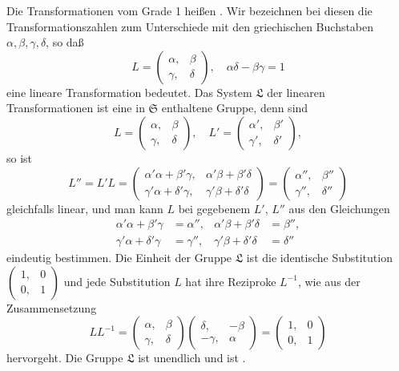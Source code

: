 Die Transformationen vom Grade 1 heißen . Wir bezeichnen bei diesen die Transformationszahlen zum Unterschiede mit den griechischen Buchstaben $\alpha, \beta, \gamma, \delta$, so daß
\[
L = \begin{pmatrix} \alpha, & \beta \\ \gamma, & \delta \end{pmatrix}, \quad \alpha\delta - \beta\gamma = 1
\]
eine lineare Transformation bedeutet. Das System $\mathfrak{L}$ der linearen Transformationen ist eine in $\mathfrak{S}$ enthaltene Gruppe, denn sind
\[
L = \begin{pmatrix} \alpha, & \beta \\ \gamma, & \delta \end{pmatrix}, \quad L' = \begin{pmatrix} \alpha', & \beta' \\ \gamma', & \delta' \end{pmatrix},
\]
so ist
\[
L'' = L'L = \begin{pmatrix} \alpha'\alpha+\beta'\gamma, & \alpha'\beta+\beta'\delta \\ \gamma'\alpha+\delta'\gamma, & \gamma'\beta+\delta'\delta \end{pmatrix} = \begin{pmatrix} \alpha'', & \beta'' \\ \gamma'', & \delta'' \end{pmatrix}
\]
gleichfalls linear, und man kann $L$ bei gegebenem $L'$, $L''$ aus den Gleichungen
\[
\begin{aligned}
\alpha'\alpha+\beta'\gamma &= \alpha'', & \alpha'\beta+\beta'\delta &= \beta'', \\
\gamma'\alpha+\delta'\gamma &= \gamma'', & \gamma'\beta+\delta'\delta &= \delta''
\end{aligned}
\]
eindeutig bestimmen. Die Einheit der Gruppe $\mathfrak{L}$ ist die identische Substitution $\begin{pmatrix} 1, & 0 \\ 0, & 1 \end{pmatrix}$ und jede Substitution $L$ hat ihre Reziproke $L^{-1}$, wie aus der Zusammensetzung
\[
LL^{-1} = \begin{pmatrix} \alpha, & \beta \\ \gamma, & \delta \end{pmatrix}\begin{pmatrix} \delta, & -\beta \\ -\gamma, & \alpha \end{pmatrix} = \begin{pmatrix} 1, & 0 \\ 0, & 1 \end{pmatrix}
\]
hervorgeht. Die Gruppe $\mathfrak{L}$ ist unendlich und ist .
